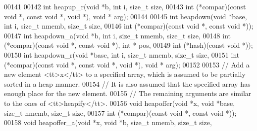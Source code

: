 \begin{DoxyCode}
00141 
00142 \textcolor{keywordtype}{int} heapup\_r(\textcolor{keywordtype}{void} *b, \textcolor{keywordtype}{int} i, \textcolor{keywordtype}{size\_t} size,
00143                 \textcolor{keywordtype}{int} (*compar)(\textcolor{keyword}{const} \textcolor{keywordtype}{void} *, \textcolor{keyword}{const} \textcolor{keywordtype}{void} *, \textcolor{keywordtype}{void} *), \textcolor{keywordtype}{void} * arg);
00144 
00145 \textcolor{keywordtype}{int} heapdown(\textcolor{keywordtype}{void} *base, \textcolor{keywordtype}{int} i, \textcolor{keywordtype}{size\_t} nmemb, \textcolor{keywordtype}{size\_t} size,
00146                 \textcolor{keywordtype}{int} (*compar)(\textcolor{keyword}{const} \textcolor{keywordtype}{void} *, \textcolor{keyword}{const} \textcolor{keywordtype}{void} *));
00147 \textcolor{keywordtype}{int} heapdown\_a(\textcolor{keywordtype}{void} *b, \textcolor{keywordtype}{int} i, \textcolor{keywordtype}{size\_t} nmemb, \textcolor{keywordtype}{size\_t} size,
00148                 \textcolor{keywordtype}{int} (*compar)(\textcolor{keyword}{const} \textcolor{keywordtype}{void} *, \textcolor{keyword}{const} \textcolor{keywordtype}{void} *), \textcolor{keywordtype}{int} * pos,
00149                 \textcolor{keywordtype}{int} (*hash)(\textcolor{keyword}{const} \textcolor{keywordtype}{void} *));
00150 \textcolor{keywordtype}{int} heapdown\_r(\textcolor{keywordtype}{void} *base, \textcolor{keywordtype}{int} i, \textcolor{keywordtype}{size\_t} nmemb, \textcolor{keywordtype}{size\_t} size,
00151                 \textcolor{keywordtype}{int} (*compar)(\textcolor{keyword}{const} \textcolor{keywordtype}{void} *, \textcolor{keyword}{const} \textcolor{keywordtype}{void} *, \textcolor{keywordtype}{void} *), \textcolor{keywordtype}{void} * arg);
00152 
00153 \textcolor{comment}{// Add a new element <tt>x</tt> to a specified array, which is assumed to be partially sorted in a heap
       manner.}
00154 \textcolor{comment}{// It is also assumed that the specified array has enough place for the new element.}
00155 \textcolor{comment}{// The remaining arguments are similar to the ones of <tt>heapify</tt>.}
00156 \textcolor{keywordtype}{void} heapoffer(\textcolor{keywordtype}{void} *x, \textcolor{keywordtype}{void} *base, \textcolor{keywordtype}{size\_t} nmemb, \textcolor{keywordtype}{size\_t} size,
00157                 \textcolor{keywordtype}{int} (*compar)(\textcolor{keyword}{const} \textcolor{keywordtype}{void} *, \textcolor{keyword}{const} \textcolor{keywordtype}{void} *));
00158 \textcolor{keywordtype}{void} heapoffer\_a(\textcolor{keywordtype}{void} *x, \textcolor{keywordtype}{void} *b, \textcolor{keywordtype}{size\_t} nmemb, \textcolor{keywordtype}{size\_t} size,

\end{DoxyCode}
